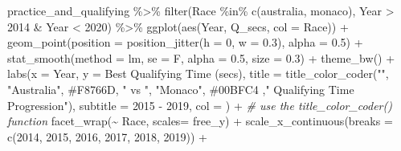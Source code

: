\documentclass[
]{book}
\newenvironment{Shaded}{\begin{snugshade}}{\end{snugshade}}
\newcommand{\AttributeTok}[1]{\textcolor[rgb]{0.77,0.63,0.00}{#1}}
\newcommand{\CommentTok}[1]{\textcolor[rgb]{0.56,0.35,0.01}{\textit{#1}}}
\newcommand{\DecValTok}[1]{\textcolor[rgb]{0.00,0.00,0.81}{#1}}
\newcommand{\FloatTok}[1]{\textcolor[rgb]{0.00,0.00,0.81}{#1}}
\newcommand{\FunctionTok}[1]{\textcolor[rgb]{0.00,0.00,0.00}{#1}}
\newcommand{\NormalTok}[1]{#1}
\newcommand{\SpecialCharTok}[1]{\textcolor[rgb]{0.00,0.00,0.00}{#1}}
\newcommand{\StringTok}[1]{\textcolor[rgb]{0.31,0.60,0.02}{#1}}
\begin{document}
\begin{Shaded}
\begin{Highlighting}[]
\NormalTok{practice\_and\_qualifying }\SpecialCharTok{\%\textgreater{}\%}
  \FunctionTok{filter}\NormalTok{(Race }\SpecialCharTok{\%in\%} \FunctionTok{c}\NormalTok{(}\StringTok{\textquotesingle{}australia\textquotesingle{}}\NormalTok{, }\StringTok{\textquotesingle{}monaco\textquotesingle{}}\NormalTok{),}
\NormalTok{         Year }\SpecialCharTok{\textgreater{}} \DecValTok{2014} \SpecialCharTok{\&}\NormalTok{ Year }\SpecialCharTok{\textless{}} \DecValTok{2020}\NormalTok{) }\SpecialCharTok{\%\textgreater{}\%}
  \FunctionTok{ggplot}\NormalTok{(}\FunctionTok{aes}\NormalTok{(Year, Q\_secs, }\AttributeTok{col =}\NormalTok{ Race)) }\SpecialCharTok{+}
  \FunctionTok{geom\_point}\NormalTok{(}\AttributeTok{position =} \FunctionTok{position\_jitter}\NormalTok{(}\AttributeTok{h =} \DecValTok{0}\NormalTok{, }\AttributeTok{w =} \FloatTok{0.3}\NormalTok{), }\AttributeTok{alpha =} \FloatTok{0.5}\NormalTok{) }\SpecialCharTok{+}
  \FunctionTok{stat\_smooth}\NormalTok{(}\AttributeTok{method =} \StringTok{\textquotesingle{}lm\textquotesingle{}}\NormalTok{, }\AttributeTok{se =}\NormalTok{ F, }\AttributeTok{alpha =} \FloatTok{0.5}\NormalTok{, }\AttributeTok{size =} \FloatTok{0.3}\NormalTok{) }\SpecialCharTok{+}
  \FunctionTok{theme\_bw}\NormalTok{() }\SpecialCharTok{+}
  \FunctionTok{labs}\NormalTok{(}\AttributeTok{x =} \StringTok{\textquotesingle{}Year\textquotesingle{}}\NormalTok{,}
       \AttributeTok{y =} \StringTok{\textquotesingle{}Best Qualifying Time (secs)\textquotesingle{}}\NormalTok{,}
       \AttributeTok{title =} \FunctionTok{title\_color\_coder}\NormalTok{(}\StringTok{""}\NormalTok{, }\StringTok{"Australia"}\NormalTok{, }\StringTok{\textquotesingle{}\#F8766D\textquotesingle{}}\NormalTok{, }\StringTok{" vs "}\NormalTok{, }\StringTok{"Monaco"}\NormalTok{, }\StringTok{\textquotesingle{}\#00BFC4\textquotesingle{}}\NormalTok{ ,}\StringTok{" Qualifying Time Progression"}\NormalTok{), }
       \AttributeTok{subtitle =} \StringTok{\textquotesingle{}2015 {-} 2019\textquotesingle{}}\NormalTok{,}
       \AttributeTok{col =} \StringTok{\textquotesingle{}\textquotesingle{}}\NormalTok{) }\SpecialCharTok{+} \CommentTok{\# use the title\_color\_coder() function}
  \FunctionTok{facet\_wrap}\NormalTok{(}\SpecialCharTok{\textasciitilde{}}\NormalTok{ Race, }\AttributeTok{scales=} \StringTok{\textquotesingle{}free\_y\textquotesingle{}}\NormalTok{) }\SpecialCharTok{+}
  \FunctionTok{scale\_x\_continuous}\NormalTok{(}\AttributeTok{breaks =} \FunctionTok{c}\NormalTok{(}\DecValTok{2014}\NormalTok{, }\DecValTok{2015}\NormalTok{, }\DecValTok{2016}\NormalTok{, }\DecValTok{2017}\NormalTok{, }\DecValTok{2018}\NormalTok{, }\DecValTok{2019}\NormalTok{)) }\SpecialCharTok{+} 

\end{Highlighting}
\end{Shaded}
\end{document}
